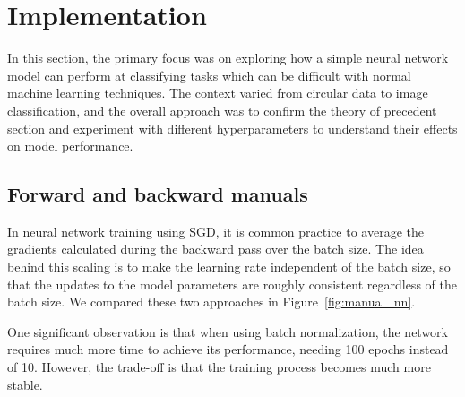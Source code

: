 \section{Implementation}

In this section, the primary focus was on exploring how a simple neural network model can perform at classifying tasks which can be difficult with normal machine learning techniques. The context varied from circular data to image classification, and the overall approach was to confirm the theory of precedent section and experiment with different hyperparameters to understand their effects on model performance.

\subsection{Forward and backward manuals}
In neural network training using SGD, it is common practice to average the gradients calculated during the backward pass over the batch size. The idea behind this scaling is to make the learning rate independent of the batch size, so that the updates to the model parameters are roughly consistent regardless of the batch size. We compared these two approaches in Figure~\ref{fig:manual_nn}.

One significant observation is that when using batch normalization, the network requires much more time to achieve its performance, needing 100 epochs instead of 10. However, the trade-off is that the training process becomes much more stable.

